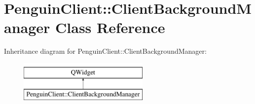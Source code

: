 \hypertarget{classPenguinClient_1_1ClientBackgroundManager}{\section{Penguin\-Client\-:\-:Client\-Background\-Manager Class Reference}
\label{classPenguinClient_1_1ClientBackgroundManager}
}
Inheritance diagram for Penguin\-Client\-:\-:Client\-Background\-Manager\-:\begin{figure}[H]
\begin{center}
\leavevmode
\includegraphics[height=2.000000cm]{classPenguinClient_1_1ClientBackgroundManager}
\end{center}
\end{figure}

